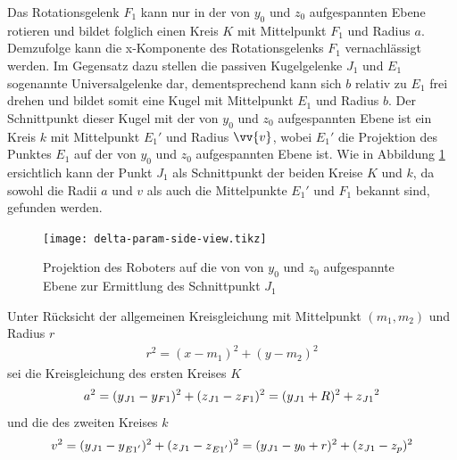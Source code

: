 \documentclass[Bachelor, BMR, ngerman]{twbook}
\begin{document}
    \noindent
    Das Rotationsgelenk $F_1$ kann nur in der von $y_0$ und $z_0$ aufgespannten Ebene rotieren und bildet folglich einen Kreis $K$ mit Mittelpunkt $F_1$ und Radius $a$. Demzufolge kann die x-Komponente des Rotationsgelenks $F_1$ vernachlässigt werden. Im Gegensatz dazu stellen die passiven Kugelgelenke $J_1$ und $E_1$ sogenannte Universalgelenke dar, dementsprechend kann sich $b$ relativ zu $E_1$ frei drehen und bildet somit eine Kugel mit Mittelpunkt $E_1$ und Radius $b$. Der Schnittpunkt dieser Kugel mit der von $y_0$ und $z_0$ aufgespannten Ebene ist ein Kreis $k$ mit Mittelpunkt $E_1'$ und Radius $\vv{v}$, wobei $E_1'$ die Projektion des Punktes $E_1$ auf der von $y_0$ und $z_0$ aufgespannten Ebene ist. Wie in Abbildung \ref{fig:delta-param-side-view} ersichtlich kann der Punkt $J_1$ als Schnittpunkt der beiden Kreise $K$ und $k$, da sowohl die Radii $a$ und $v$ als auch die Mittelpunkte $E_1'$ und $F_1$ bekannt sind, gefunden werden.
    \begin{figure}[H] 
      \centering
      {
        \texttt{[image: delta-param-side-view.tikz]}
      }
      \caption[Projektion des Roboters auf die von von $y_0$ und $z_0$ aufgespannte Ebene zur Ermittlung des Schnittpunkt $J_1$]{Projektion des Roboters auf die von von $y_0$ und $z_0$ aufgespannte Ebene zur Ermittlung des Schnittpunkt $J_1$}
      \label{fig:delta-param-side-view}
    \end{figure}
    \noindent
    Unter Rücksicht der allgemeinen Kreisgleichung mit Mittelpunkt $(m_1, m_2)$ und Radius $r$  
    \newline
    \begin{align}
        r^2 = (x - m_1)^2 + (y - m_2)^2
        \label{eq:kreisgleichung_allgemein}
    \end{align}
    \noindent
    sei die Kreisgleichung des ersten Kreises $K$ 
    \newline
    \begin{align}
        a^2 = (y\textsubscript{$J1$} - y\textsubscript{$F1$})^2 + (z\textsubscript{$J1$} - z\textsubscript{$F1$})^2 = (y\textsubscript{$J1$} + R)^2 + z\textsubscript{$J1$}^2
        \label{eq:kreisgleichung_K}
    \end{align}
    \noindent
    und die des zweiten Kreises $k$ 
    \newline
    \begin{align}
        v^2 = (y\textsubscript{$J1$} - y\textsubscript{$E1'$})^2 + (z\textsubscript{$J1$} - z\textsubscript{$E1'$})^2 = (y\textsubscript{$J1$} - y_0 + r)^2 + (z\textsubscript{$J1$} - z_p)^2
        \label{eq:kreisgleichung_k}
    \end{align}
\end{document}
